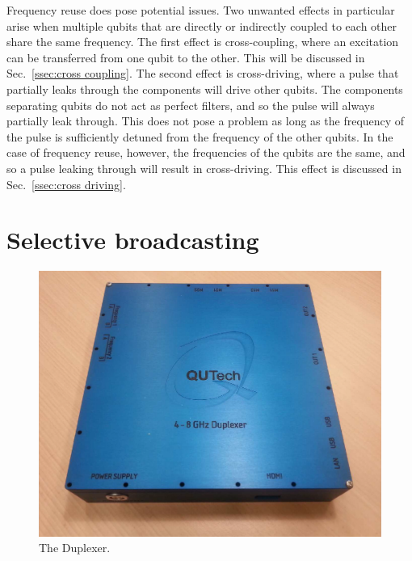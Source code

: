       Frequency reuse does pose potential issues. Two unwanted effects in particular arise when multiple qubits that are directly or indirectly coupled to each other share the same frequency. The first effect is cross-coupling, where an excitation can be transferred from one qubit to the other. This will be discussed in Sec.~\ref{ssec:cross coupling}. The second effect is cross-driving, where a pulse that partially leaks through the components will drive other qubits. The components separating qubits do not act as perfect filters, and so the pulse will always partially leak through. This does not pose a problem as long as the frequency of the pulse is sufficiently detuned from the frequency of the other qubits. In the case of frequency reuse, however, the frequencies of the qubits are the same, and so a pulse leaking through will result in cross-driving. This effect is discussed in Sec.~\ref{ssec:cross driving}.

    \section{Selective broadcasting}
      \label{sec:selective broadcasting using the Duplexer}
      \begin{figure}
        \begin{center}
        \vspace{-30pt}
          \includegraphics[width=\textwidth]{Figures/Duplexer_with_background.png}
        \end{center}
        \vspace{-5pt}
        \caption{The Duplexer.}
        \label{fig:Duplexer picture}
        \vspace{-10pt}
      \end{figure}

